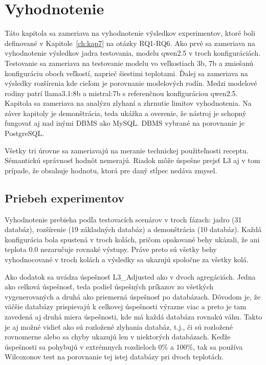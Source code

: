 

\chapter{Vyhodnotenie}
\label{ch:kap8}
Táto kapitola sa zameriava na vyhodnotenie výsledkov experimentov, ktoré boli definované v Kapitole~\ref{ch:kap7} na otázky RQ1-RQ6. Ako prvé sa zameriava na vyhodnotenie výsledkov jadra testovania, modelu qwen2.5 v troch konfiguráciách. Testovanie sa zameriava na testovanie modelu vo veľkostiach 3b, 7b a zmiešanú konfiguráciu oboch veľkostí, naprieč šiestimi teplotami. Ďalej sa zameriava na výsledky rozšírenia kde cieľom je porovnanie modelových rodín. Medzi modelové rodiny patrí llama3.1:8b a mistral:7b s referenčnou konfiguráciou qwen2.5. Kapitola sa zameriava na analýzu zlyhaní a zhrnutie limitov vyhodnotenia. Na záver kapitoly je demonštrácia, teda ukážka a overenie, že nástroj je schopný fungovať aj nad inými DBMS ako MySQL. DBMS vybrané na porovnanie je PostgreSQL. 

Všetky tri úrovne sa zameriavajú na meranie technickej použiteľnosti receptu. Sémantickú správnosť  hodnôt nemerajú. Riadok môže úspešne prejsť L3 aj v tom prípade, že obsahuje hodnotu, ktorá pre daný stĺpec nedáva zmysel.


\section{Priebeh experimentov}
Vyhodnotenie prebieha podľa testovacích scenárov v troch fázach: jadro (31 databáz), rozšírenie (19 základných databáz) a demonštrácia (10 databáz). Každá konfigurácia bola spustená v troch kolách, pričom opakované behy ukázali, že ani teplota 0.0 nezaručuje rovnaké výstupy. Práve preto sú všetky behy vyhodnocované v troch kolách a výsledky sa ukazujú spoločne za všetky kolá.


Ako dodatok sa uvádza úspešnosť L3\_Adjusted ako v dvoch agregáciách. Jedna ako celková úspešnosť, teda podiel úspešných príkazov zo všetkých vygenerovaných a druhá ako priemerná úspešnosť po databázach. Dôvodom je, že väčšie databázy prispievajú k celkovej úspešnosti výrazne viac a preto je tam zavedená aj druhá miera úspešnosti, kde má každá databáza rovnakú váhu. Takto je aj možné vidieť ako sú rozložené zlyhania databáz, t.j., či sú rozložené rovnomerne alebo sa chyby ukazujú len v niektorých databázach. Keďže úspešnosti sa pohybujú v extrémnych rozdieloch 0\% a 100\%, tak sa používa Wilcoxonov test na porovnanie tej istej databázy pri dvoch teplotách.


